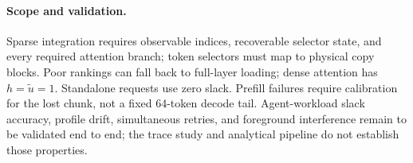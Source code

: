 \paragraph{Scope and validation.}
\label{sec:design-discussion}
Sparse integration requires observable indices, recoverable selector
state, and every required attention branch; token selectors must map
to physical copy blocks. Poor rankings can fall back to full-layer
loading; dense attention has $h=\widetilde u=1$. Standalone requests
use zero slack. Prefill failures require calibration for the lost chunk,
not a fixed 64-token decode tail. Agent-workload slack accuracy, profile
drift, simultaneous retries, and foreground interference remain to be
validated end to end; the trace study and analytical pipeline do not
establish those properties.
